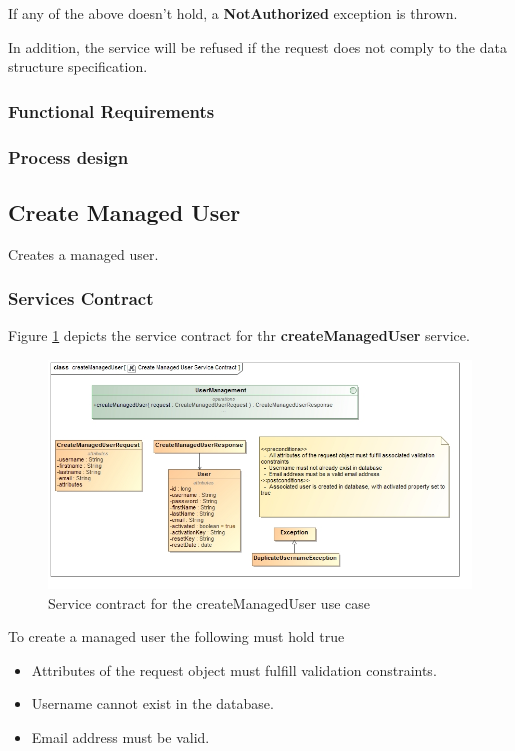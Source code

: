 If any of the above doesn't hold, a \textbf{NotAuthorized} exception is thrown.

In addition, the service will be refused if the request does not comply to the data structure specification.

\subsubsection{Functional Requirements}

\subsubsection{Process design}

\subsection{Create Managed User}
Creates a managed user.

\subsubsection{Services Contract}
Figure \ref{fig:createManagedUserServicesContract} depicts the service contract for thr \textbf{createManagedUser} service.

\begin{figure}[H]
	\begin{center}
		\includegraphics[scale=0.55]{../Diagrams and Charts/Users/Create Managed User Service Contract.jpg}
		\caption{Service contract for the createManagedUser use case}
		\label{fig:createManagedUserServicesContract}
	\end{center}
\end{figure}

To create a managed user the following must hold true
\begin{itemize}
	\item Attributes of the request object must fulfill validation constraints.
	\item Username cannot exist in the database.
	\item Email address must be valid.
\end{itemize}


